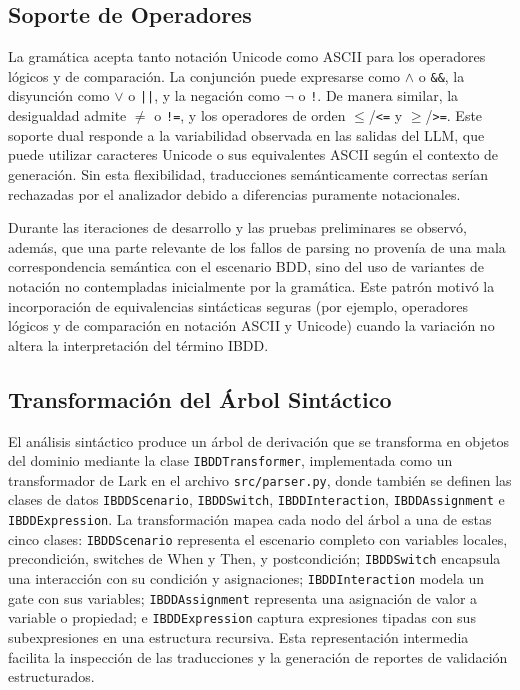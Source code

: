 \subsection{Soporte de Operadores}

La gramática acepta tanto notación Unicode como ASCII para los operadores lógicos y de comparación. La conjunción puede expresarse como $\wedge$ o \texttt{\&\&}, la disyunción como $\vee$ o \texttt{||}, y la negación como $\neg$ o \texttt{!}. De manera similar, la desigualdad admite $\neq$ o \texttt{!=}, y los operadores de orden $\leq$/\texttt{<=} y $\geq$/\texttt{>=}. Este soporte dual responde a la variabilidad observada en las salidas del LLM, que puede utilizar caracteres Unicode o sus equivalentes ASCII según el contexto de generación. Sin esta flexibilidad, traducciones semánticamente correctas serían rechazadas por el analizador debido a diferencias puramente notacionales.

Durante las iteraciones de desarrollo y las pruebas preliminares se observó, además, que una parte relevante de los fallos de parsing no provenía de una mala correspondencia semántica con el escenario BDD, sino del uso de variantes de notación no contempladas inicialmente por la gramática. Este patrón motivó la incorporación de equivalencias sintácticas seguras (por ejemplo, operadores lógicos y de comparación en notación ASCII y Unicode) cuando la variación no altera la interpretación del término IBDD.

\subsection{Transformación del Árbol Sintáctico}

El análisis sintáctico produce un árbol de derivación que se transforma en objetos del dominio mediante la clase \texttt{IBDDTransformer}, implementada como un transformador de Lark en el archivo \texttt{src/parser.py}, donde también se definen las clases de datos \texttt{IBDDScenario}, \texttt{IBDDSwitch}, \texttt{IBDDInteraction}, \texttt{IBDDAssignment} e \texttt{IBDDExpression}. La transformación mapea cada nodo del árbol a una de estas cinco clases: \texttt{IBDDScenario} representa el escenario completo con variables locales, precondición, switches de When y Then, y postcondición; \texttt{IBDDSwitch} encapsula una interacción con su condición y asignaciones; \texttt{IBDDInteraction} modela un gate con sus variables; \texttt{IBDDAssignment} representa una asignación de valor a variable o propiedad; e \texttt{IBDDExpression} captura expresiones tipadas con sus subexpresiones en una estructura recursiva. Esta representación intermedia facilita la inspección de las traducciones y la generación de reportes de validación estructurados.

